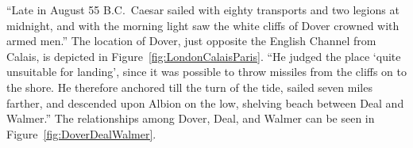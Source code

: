 \documentclass[twocolumn]{book}
\begin{document}
``Late in August 55 B.C.~Caesar sailed with eighty transports and two legions
at midnight, and with the morning light saw the white cliffs of Dover crowned
with armed men.'' The location of Dover, just opposite the English Channel from
Calais, is depicted in Figure~\ref{fig:LondonCalaisParis}. ``He judged the
place `quite unsuitable for landing', since it was possible to throw missiles
from the cliffs on to the shore. He therefore anchored till the turn of the
tide, sailed seven miles farther, and descended upon Albion on the low,
shelving beach between Deal and Walmer.'' The relationships among Dover, Deal,
and Walmer can be seen in Figure~\ref{fig:DoverDealWalmer}.

\backmatter%
\end{document}
